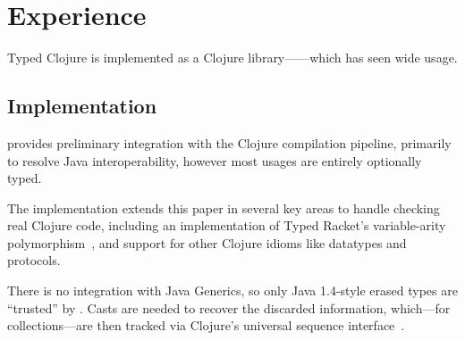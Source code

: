 \section{Experience}
\label{sec:experience}

Typed Clojure is implemented as a Clojure library---\coretyped{}---which has seen wide usage.

\subsection{Implementation}

\coretyped{} provides preliminary integration with the Clojure compilation
pipeline, primarily to resolve Java interoperability, however
most usages are entirely optionally typed.

The \coretyped{} implementation extends this paper in several key areas 
to handle checking real Clojure code, including an implementation
of Typed Racket's variable-arity polymorphism~\cite{stf-esop}, 
and support for other Clojure idioms like datatypes and protocols.

There is no integration with Java Generics, so only Java 1.4-style erased types are ``trusted''
by \coretyped{}.
Casts are needed to recover the discarded information, which---for collections---are 
then tracked via Clojure's universal sequence interface~\cite{CljSeqDoc}.



